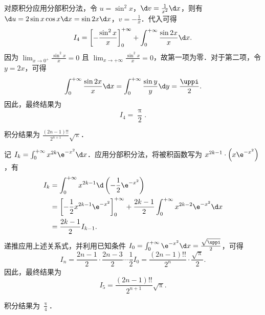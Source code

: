 \begin{solution}
    对原积分应用分部积分法，令 $u = \sin^2 x$，$\d v = \frac{1}{x^2} \d x$，则有 $\d u = 2 \sin x \cos x \d x = \sin 2x \d x$，$v = -\frac{1}{x}$．代入可得
    \begin{equation}\label{eq:int4-1}
        I_4 = \left[ -\frac{\sin^2 x}{x} \right]_{0}^{+\infty} + \int_{0}^{+\infty} \frac{\sin 2x}{x} \d x.
    \end{equation}
    因为 $\lim_{x \to 0^+} \frac{\sin^2 x}{x} = 0$ 且 $\lim_{x \to +\infty} \frac{\sin^2 x}{x} = 0$，故第一项为零．对于第二项，令 $y = 2x$，可得
    \begin{equation}\label{eq:int4-2}
        \int_{0}^{+\infty} \frac{\sin 2x}{x} \d x = \int_{0}^{+\infty} \frac{\sin y}{y} \d y = \frac{\uppi}{2}.
    \end{equation}
    因此，最终结果为
    \begin{equation}
        I_4 = \boxed{\frac{\uppi}{2}}.
    \end{equation}

     积分结果为 $\frac{(2n-1)!!}{2^{n+1}} \sqrt{\uppi}$．

    记 $I_k = \int_{0}^{+\infty} x^{2k} \e^{-x^2} \d x$．应用分部积分法，将被积函数写为 $x^{2k-1} \cdot \left( x \e^{-x^2} \right)$，有
    \begin{equation}\label{eq:int5-1}
        \begin{aligned}
            I_k & = \int_{0}^{+\infty} x^{2k-1} \d \left( -\frac{1}{2} \e^{-x^2} \right)                                                     \\
                & = \left[ -\frac{1}{2} x^{2k-1} \e^{-x^2} \right]_{0}^{+\infty} + \frac{2k-1}{2} \int_{0}^{+\infty} x^{2k-2} \e^{-x^2} \d x \\
                & = \frac{2k-1}{2} I_{k-1}.
        \end{aligned}
    \end{equation}
    递推应用上述关系式，并利用已知条件 $I_0 = \int_{0}^{+\infty} \e^{-x^2} \d x = \frac{\sqrt{\uppi}}{2}$，可得
    \begin{equation}\label{eq:int5-2}
        I_n = \frac{2n-1}{2} \cdot \frac{2n-3}{2} \cdots \frac{1}{2} I_0 = \frac{(2n-1)!!}{2^n} \cdot \frac{\sqrt{\uppi}}{2}.
    \end{equation}
    因此，最终结果为
    \begin{equation}
        I_5 = \boxed{\frac{(2n-1)!!}{2^{n+1}} \sqrt{\uppi}}.
    \end{equation}

     积分结果为 $\frac{\uppi}{4}$．


\end{solution}
